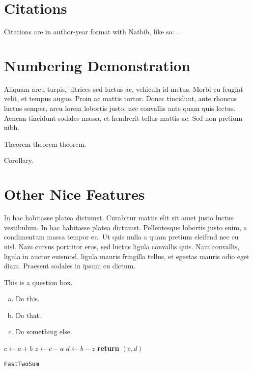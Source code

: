 \documentclass{article}
\begin{document}
\section{Citations}
Citations are in author-year format with Natbib, like so: \citep{lamport1994latex}.
\section{Numbering Demonstration}
Aliquam arcu turpis, ultrices sed luctus ac, vehicula id metus. Morbi eu feugiat velit, et tempus augue. Proin ac mattis tortor. Donec tincidunt, ante rhoncus luctus semper, arcu lorem lobortis justo, nec convallis ante quam quis lectus. Aenean tincidunt sodales massa, et hendrerit tellus mattis ac. Sed non pretium nibh.

\begin{thm}
Theorem theorem theorem.
\end{thm}
\begin{corr}
Corollary. 
\end{corr}


\section{Other Nice Features} %

In hac habitasse platea dictumst. Curabitur mattis elit sit amet justo luctus vestibulum. In hac habitasse platea dictumst. Pellentesque lobortis justo enim, a condimentum massa tempor eu. Ut quis nulla a quam pretium eleifend nec eu nisl. Nam cursus porttitor eros, sed luctus ligula convallis quis. Nam convallis, ligula in auctor euismod, ligula mauris fringilla tellus, et egestas mauris odio eget diam. Praesent sodales in ipsum eu dictum.

\begin{question}
	This is a question box.
	\begin{enumerate}[(a)]
		\item Do this.
		\item Do that.
		\item Do something else.
	\end{enumerate}
\end{question}
	
\begin{center}
	\begin{minipage}{0.5\linewidth}
		\begin{algorithm}[H]
			\medskip
			$c \leftarrow a + b$ \;
			$z \leftarrow c - a$ \;
			$d \leftarrow b - z$ \;
			{\bf return} $(c,d)$ \;
			\caption{\texttt{FastTwoSum}} 
			\label{alg:fastTwoSum}  
		\end{algorithm}
	\end{minipage}
\end{center}
\end{document}
